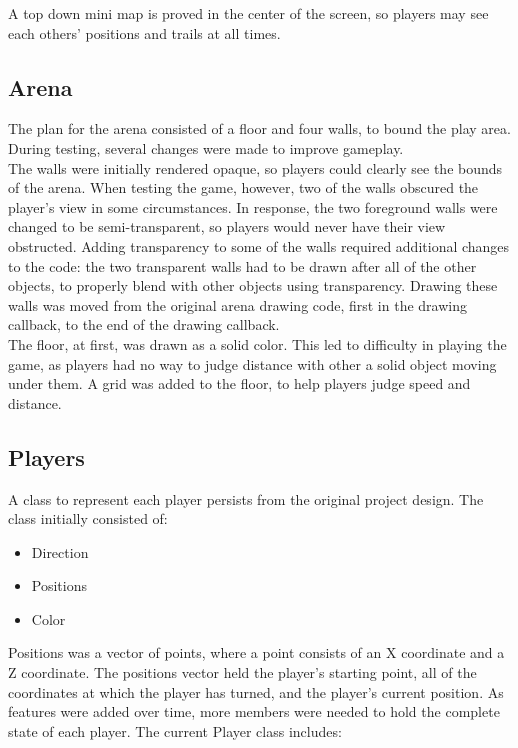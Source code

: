 \documentclass[12pt]{article}
\begin{document}
A top down mini map is proved in the center of the screen, so players may see each others' positions and trails at all times.

\subsection{Arena}
\label{sec:arena_design}

The plan for the arena consisted of a floor and four walls, to bound the play area.  During testing, several changes were made to improve gameplay. \\

The walls were initially rendered opaque, so players could clearly see the bounds of the arena.  When testing the game, however, two of the walls obscured the player's view in some circumstances.  In response, the two foreground walls were changed to be semi-transparent, so players would never have their view obstructed.  Adding transparency to some of the walls required additional changes to the code: the two transparent walls had to be drawn after all of the other objects, to properly blend with other objects using transparency.  Drawing these walls was moved from the original arena drawing code, first in the drawing callback, to the end of the drawing callback.\\

The floor, at first, was drawn as a solid color.  This led to difficulty in playing the game, as players had no way to judge distance with other a solid object moving under them.  A grid was added to the floor, to help players judge speed and distance.

\subsection{Players}

A class to represent each player persists from the original project design.  The class initially consisted of:

\begin{itemize}
\item Direction
\item Positions
\item Color
\end{itemize}

Positions was a vector of points, where a point consists of an X coordinate and a Z coordinate.  The positions vector held the player's starting point, all of the coordinates at which the player has turned, and the player's current position.  As features were added over time, more members were needed to hold the complete state of each player.  The current Player class includes:
\end{document}
